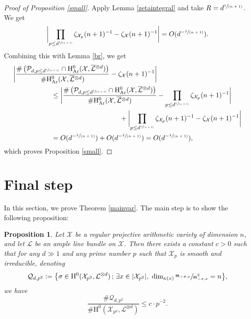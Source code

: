 \documentclass[JEP,XML,SOM,Unicode,published]{cedram}
\newcommand{\spfrac}[2]{\sfrac{#1}{(#2)}}
\newcommand{\sep}{\,;\,}
\theoremstyle{plain}
\newtheorem{prop}[thm]{Proposition}
\theoremstyle{definition}
\newcommand{\ho}{\mathrm{H}}
\newcommand{\X}{\mathcal{X}}
\newcommand{\li}{\mathcal{L}}
\begin{document}
\begin{proof}[Proof of Proposition \ref{small}]
Apply Lemma \ref{zetaintegral} and take $R=d^{\spfrac{1}{n+1}}$. We get
\begin{align*}
\biggl| \prod_{p\leq d^{\spfrac{1}{n+1}}}\zeta_{\X_p}(n+1)^{-1}-\zeta_\X(n+1)^{-1} \biggr| =O(d^{-\spfrac{1}{n+1}}).
\end{align*}
Combining this with Lemma \ref{br}, we get
\begin{align*}
\biggl| \frac{\#\left(\mathcal{P}_{d, p\leq d^{\spfrac{1}{n+1}}}\cap \ho^0_{\mathrm{Ar}}(\X, \overline{\mathcal{L}}{}^{\otimes d})\right)}{\#\ho^0_{\mathrm{Ar}}(\X, \overline{\mathcal{L}}{}^{\otimes d})} &-\zeta_\X(n+1)^{-1} \biggr| \\
&\hspace*{-3cm}\leq \biggl| \frac{\#\left(\mathcal{P}_{d, p\leq d^{\spfrac{1}{n+1}}}\cap \ho^0_{\mathrm{Ar}}(\X, \overline{\mathcal{L}}{}^{\otimes d})\right)}{\#\ho^0_{\mathrm{Ar}}(\X, \overline{\mathcal{L}}{}^{\otimes d})} -\prod_{p\leq d^{\spfrac{1}{n+1}}}\zeta_{\X_p}(n+1)^{-1} \biggr|\\
& \hspace*{.5cm}+\biggl| \prod_{p\leq d^{\spfrac{1}{n+1}}}\zeta_{\X_p}(n+1)^{-1}-\zeta_\X(n+1)^{-1} \biggr| \\
&\hspace*{-3cm}=O(d^{-\spfrac{1}{n+1}})+O(d^{-\spfrac{1}{n+1}})=O(d^{-\spfrac{1}{n+1}}),
\end{align*}
which proves Proposition \ref{small}.
\end{proof}

\section{Final step}\label{finalresult}

In this section, we prove Theorem \ref{mainvar}. The main step is to show the following proposition:
\begin{prop}\label{singmed}
Let $\X$ be a regular projective arithmetic variety of dimension $n$, and let $\li$ be an ample line bundle on $\X$. Then there exists a constant $c>0$ such that for any $d\gg 1$ and any prime number $p$ such that $\X_p$ is smooth and irreducible, denoting
\[
\mathcal{Q}_{d,p^2}:=\bigl\{ \sigma\in \ho^0(\X_{p^2}, \li^{\otimes d})\sep \exists x\in |\X_{p^2}|,\ \dim_{\kappa(x)}\sfrac{\mathfrak{m}_{\div \sigma,x}}{\mathfrak{m}_{\div \sigma,x}^2}=n \bigr\},
\]
we have
\[
\frac{\#\mathcal{Q}_{d,p^2}}{\#\ho^0(\X_{p^2}, \li^{\otimes d})}\leq c\cdot p^{-2}.
\]
\end{prop}
\end{document}
